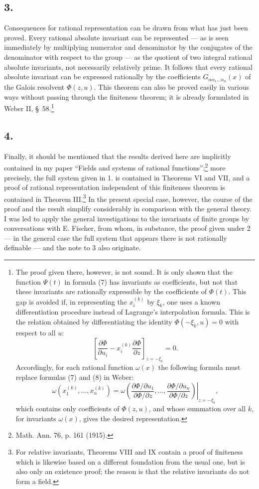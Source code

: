\documentclass[11pt]{article}
\begin{document}
\subsection*{3.}
Consequences for rational representation can be drawn from what has just been proved. Every rational absolute invariant can be represented --- as is seen immediately by multiplying numerator and denominator by the conjugates of the denominator with respect to the group --- as the quotient of two integral rational absolute invariants, not necessarily relatively prime. It follows that every rational absolute invariant can be expressed rationally by the coefficients $G_{\alpha\alpha_1\ldots\alpha_n}(x)$ of the Galois resolvent $\Phi(z,u)$. This theorem can also be proved easily in various ways without passing through the finiteness theorem; it is already formulated in Weber II, \S\ 58.\footnote{The proof given there, however, is not sound. It is only shown that the function $\Psi(t)$ in formula (7) has invariants as coefficients, but not that these invariants are rationally expressible by the coefficients of $\Phi(t)$. This gap is avoided if, in representing the $x_i^{(k)}$ by $\xi_k$, one uses a known differentiation procedure instead of Lagrange's interpolation formula. This is the relation obtained by differentiating the identity $\Phi(-\xi_k,u)=0$ with respect to all $u$:
\[
 \left[\frac{\partial\Phi}{\partial u_i}
      -x_i^{(k)}\frac{\partial\Phi}{\partial z}\right]_{z=-\xi_k}=0.
\]
Accordingly, for each rational function $\omega(x)$ the following formula must replace formulas (7) and (8) in Weber:
\[
 \omega(x_1^{(k)},\ldots,x_n^{(k)})=
 \left.
 \omega\!\left(
   \frac{\partial\Phi/\partial u_1}{\partial\Phi/\partial z},\ldots,
   \frac{\partial\Phi/\partial u_n}{\partial\Phi/\partial z}
 \right)\right|_{z=-\xi_k},
\]
which contains only coefficients of $\Phi(z,u)$, and whose summation over all $k$, for invariants $\omega(x)$, gives the desired representation.}

\subsection*{4.}
Finally, it should be mentioned that the results derived here are implicitly contained in my paper ``Fields and systems of rational functions'';\footnote{Math. Ann. 76, p. 161 (1915).} more precisely, the full system given in 1. is contained in Theorems VI and VII, and a proof of rational representation independent of this finiteness theorem is contained in Theorem III.\footnote{For relative invariants, Theorems VIII and IX contain a proof of finiteness which is likewise based on a different foundation from the usual one, but is also only an existence proof; the reason is that the relative invariants do not form a field.} In the present special case, however, the course of the proof and the result simplify considerably in comparison with the general theory. I was led to apply the general investigations to the invariants of finite groups by conversations with E. Fischer, from whom, in substance, the proof given under 2 --- in the general case the full system that appears there is not rationally definable --- and the note to 3 also originate.
\end{document}

